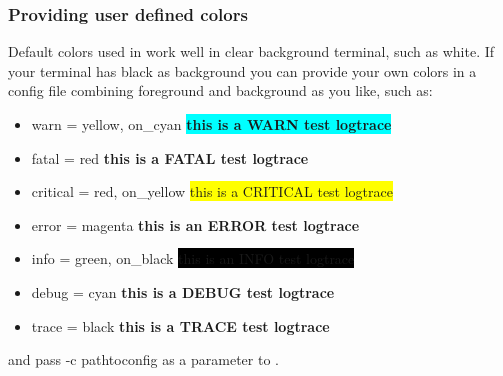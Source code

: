 
\subsubsection{Providing user defined colors}
Default colors used in \logftailer{} work well in clear background terminal,
such as white. If your terminal has black as background you can provide your own
colors in a config file combining foreground and background as you like, such as:
\begin{itemize}
 \item warn = yellow, on\_cyan \colorbox{cyan}{\color{yellow}\textbf{this is a WARN test logtrace}}
 \item fatal = red {\color{red}\textbf{this is a FATAL test logtrace}}
 \item critical = red, on\_yellow \colorbox{yellow}{\color{red}this is a CRITICAL test logtrace}
 \item error = magenta {\color{magenta}\textbf{this is an ERROR test logtrace}}
 \item info = green, on\_black \colorbox{black}{\color{green}this is an INFO test logtrace}
 \item debug = cyan {\color{cyan}\textbf{this is a DEBUG test logtrace}}
 \item trace = black {\color{black}\textbf{this is a TRACE test logtrace}}
\end{itemize}
and pass -c pathtoconfig as a parameter to \logftailer{}. 

